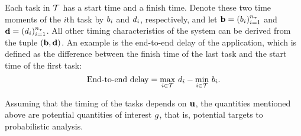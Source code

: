 Each task in $\mathcal{T}$ has a start time and a finish time. Denote these two time
moments of the $i$th task by $b_i$ and $d_i$, respectively, and let $\mathbf{b} =
(b_i)_{i=1}^{{n_\tau}}$ and $\mathbf{d} = (d_i)_{i=1}^{{n_\tau}}$. All other timing
characteristics of the system can be derived from the tuple $(\mathbf{b}, \mathbf{d})$. An
example is the end-to-end delay of the application, which is defined as the
difference between the finish time of the last task and the start time of the
first task:
\begin{equation} \elab{end-to-end-delay}
  \text{End-to-end delay} = \max_{i \in \tasks} \, \d_i - \min_{i \in \tasks} \, \b_i.
\end{equation}

Assuming that the timing of the tasks depends on $\mathbf{u}$, the quantities mentioned
above are potential quantities of interest $g$, that is, potential targets to
probabilistic analysis.
